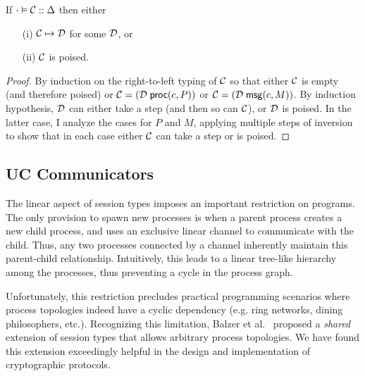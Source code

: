 \begin{theorem}
\label{thm:progress}
\mbox{}
If $\cdot \vDash \mathcal{C} :: \Delta$ then either
\begin{enumerate}
\item[(i)] $\mathcal{C} \mapsto \mathcal{D}$ for some $\mathcal{D}$, or
\item[(ii)] $\mathcal{C}$ is poised.
\end{enumerate}
\end{theorem}
\begin{proof}
By induction on the right-to-left typing of $\mathcal{C}$ so that either
$\mathcal{C}$ is empty (and therefore poised) or
$\mathcal{C} = (\mathcal{D}\; \mathsf{proc}(c, P))$ or
$\mathcal{C} = (\mathcal{D}\; \mathsf{msg}(c, M))$. By induction hypothesis, $\mathcal{D}$ can
either take a step (and then so can $\mathcal{C}$), or $\mathcal{D}$ is poised.  In
the latter case, I
analyze the cases for $P$ and $M$, applying multiple steps of
inversion to show that in each
case either $\mathcal{C}$ can take a step or is poised.
\end{proof}


\subsection{UC Communicators}
The linear aspect of session types imposes an important restriction on programs.
The only provision to spawn new processes is when a parent process creates a new
child process, and uses an exclusive linear channel to communicate with the child.
Thus, any two processes connected by a channel inherently maintain this parent-child
relationship.
Intuitively, this leads to a linear tree-like hierarchy among the processes,
thus preventing a cycle in the process graph.

Unfortunately, this restriction precludes practical programming scenarios
where process topologies indeed have a cyclic dependency (e.g. ring networks,
dining philosophers, etc.).
Recognizing this limitation, Balzer et al.~\cite{Balzer17icfp} proposed
a \emph{shared} extension of session types that allows arbitrary process topologies.
We have found this extension exceedingly helpful in the design and implementation
of cryptographic protocols.

